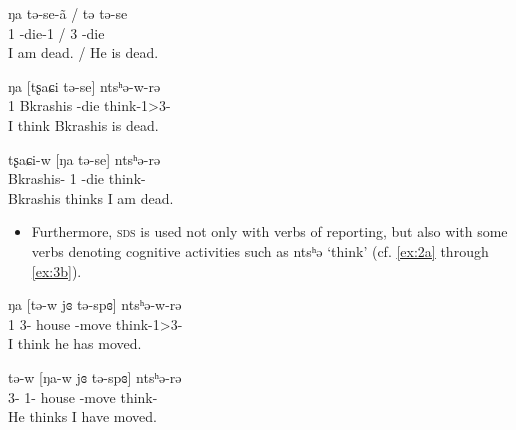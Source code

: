 \documentclass[oneside,a4paper,11pt]{article}
\newcommand{\ipa}[1]{{\phon #1}} %
\newcommand{\ipapl}[1]{{\phondroit #1}}
\begin{document}
\begin{exe}
\ex
\begin{xlist}
\ex \label{ex:2a}
\gll
	\ipa{ŋa} \ipa{tə-se-ã} / \ipa{tə} \ipa{tə-se}\\
	{1\sg}  {\prf-die-1} / {3\sg}  {\prf-die}\\ 
	\glt I am dead. / He is dead.

\ex \label{ex:2b}
\gll
	\ipa{ŋa} [\ipapl{tʂaɕi} \ipapl{tə-se}] \ipa{ntsʰə-w-rə}  \\
	{1\sg} {Bkrashis} {\prf-die} {think-1\sg>3-\const}\\ 
	\glt I think Bkrashis is dead.

\ex \label{ex:2c}
\gll
	\ipa{tʂaɕi-w} [\ipapl{ŋa} \ipapl{tə-se}] \ipa{ntsʰə-rə}  \\
	{Bkrashis-\erg} {1\sg} {\prf-die} {think-\const}\\ 
	\glt Bkrashis thinks I am dead.


\end{xlist}
\end{exe}


\begin{itemize}

\item Furthermore, \textsc{sds} is used not only with verbs of reporting, but also with some verbs denoting cognitive activities such as \ipa{ntsʰə} `think' (cf. \ref{ex:2a} through \ref{ex:3b}).
\end{itemize}

\begin{exe}
\ex
\begin{xlist}
\ex \label{ex:3a}
\gll
	\ipa{ŋa} [\ipapl{tə-w}	 \ipapl{jɞ} \ipapl{tə-spɞ}] \ipa{ntsʰə-w-rə}  \\
	 {1\sg} {3\sg-\erg} house {\prf-move} {think-1\sg>3-\const}\\ 
	\glt I think he has moved.

\ex \label{ex:3b}
\gll
	 \ipa{tə-w} [\ipapl{ŋa-w} \ipapl{jɞ} \ipapl{tə-spɞ}] \ipa{ntsʰə-rə}  \\
	  {3\sg-\erg} {1\sg-\erg} house {\prf-move} {think-\const}\\ 
	\glt He thinks I have moved.
\end{xlist}
\end{exe}
\end{document}
